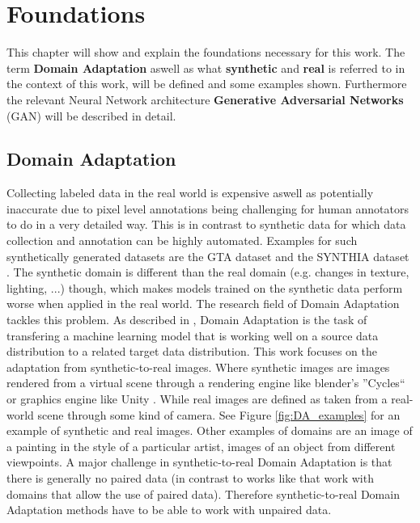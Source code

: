 \chapter{Foundations}
\label{sec:foundations}

This chapter will show and explain the foundations necessary for this work. The term \textbf{Domain Adaptation} aswell as what \textbf{synthetic} and \textbf{real} is referred to in the context of this work, will be defined and some examples shown. Furthermore the relevant Neural Network architecture \textbf{Generative Adversarial Networks} (GAN) will be described in detail.


\section{Domain Adaptation}
Collecting labeled data in the real world is expensive aswell as potentially inaccurate due to pixel level annotations being challenging for human annotators to do in a very detailed way. This is in contrast to synthetic data for which data collection and annotation can be highly automated. Examples for such synthetically generated datasets are the GTA dataset \cite{Richter_2016_ECCV} and the SYNTHIA dataset \cite{RosCVPR16}. The synthetic domain is different than the real domain (e.g. changes in texture, lighting, ...) though, which makes models trained on the synthetic data perform worse when applied in the real world. The research field of Domain Adaptation tackles this problem. As described in \cite{DBLP:journals/corr/Csurka17},
Domain Adaptation is the task of transfering a machine learning model that is working well on a source data distribution to a related target data distribution. This work focuses on the adaptation from synthetic-to-real images. Where synthetic images are images rendered from a virtual scene through a rendering engine like blender's ''Cycles`` \cite{Cycles} or graphics engine like Unity \cite{Unity}. While real images are defined as taken from a real-world scene through some kind of camera. See Figure \ref{fig:DA_examples} for an example of synthetic and real images. Other examples of domains are an image of a painting in the style of a particular artist, images of an object from different viewpoints. A major challenge in synthetic-to-real Domain Adaptation is that there is generally no paired data (in contrast to works like \cite{DBLP:journals/corr/IsolaZZE16} that work with domains that allow the use of paired data). Therefore synthetic-to-real Domain Adaptation methods have to be able to work with unpaired data. 


